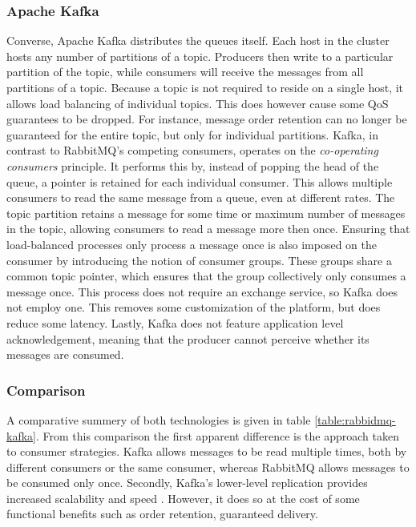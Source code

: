 \subsubsection*{Apache Kafka}
Converse, Apache Kafka \cite{web:kafka} distributes the queues itself. Each host in the cluster hosts any number of partitions of a topic. Producers then write to a particular partition of the topic, while consumers will receive the messages from all partitions of a topic. Because a topic is not required to reside on a single host, it allows load balancing of individual topics. This does however cause some QoS guarantees to be dropped. For instance, message order retention can no longer be guaranteed for the entire topic, but only for individual partitions. Kafka, in contrast to RabbitMQ's competing consumers, operates on the \emph{co-operating consumers} principle. It performs this by, instead of popping the head of the queue, a pointer is retained for each individual consumer. This allows multiple consumers to read the same message from a queue, even at different rates. The topic partition retains a message for some time or maximum number of messages in the topic, allowing consumers to read a message more then once. Ensuring that load-balanced processes only process a message once is also imposed on the consumer by introducing the notion of consumer groups. These groups share a common topic pointer, which ensures that the group collectively only consumes a message once. This process does not require an exchange service, so Kafka does not employ one. This removes some customization of the platform, but does reduce some latency. Lastly, Kafka does not feature application level acknowledgement, meaning that the producer cannot perceive whether its messages are consumed.

\subsubsection*{Comparison}

A comparative summery of both technologies is given in table \ref{table:rabbidmq-kafka}. From this comparison the first apparent difference is the approach taken to consumer strategies. Kafka allows messages to be read multiple times, both by different consumers or the same consumer, whereas RabbitMQ allows messages to be consumed only once. Secondly, Kafka's lower-level replication provides increased scalability and speed \cite{kafka_vs_rabbitmq}. However, it does so at the cost of some functional benefits such as order retention, guaranteed delivery.

